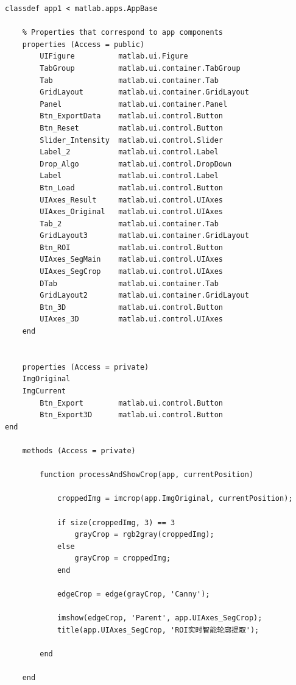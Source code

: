 \documentclass[UTF8, a4paper, 11pt]{ctexart}
\begin{document}
\newpage
\newpage
\begin{lstlisting}
classdef app1 < matlab.apps.AppBase

    % Properties that correspond to app components
    properties (Access = public)
        UIFigure          matlab.ui.Figure
        TabGroup          matlab.ui.container.TabGroup
        Tab               matlab.ui.container.Tab
        GridLayout        matlab.ui.container.GridLayout
        Panel             matlab.ui.container.Panel
        Btn_ExportData    matlab.ui.control.Button
        Btn_Reset         matlab.ui.control.Button
        Slider_Intensity  matlab.ui.control.Slider
        Label_2           matlab.ui.control.Label
        Drop_Algo         matlab.ui.control.DropDown
        Label             matlab.ui.control.Label
        Btn_Load          matlab.ui.control.Button
        UIAxes_Result     matlab.ui.control.UIAxes
        UIAxes_Original   matlab.ui.control.UIAxes
        Tab_2             matlab.ui.container.Tab
        GridLayout3       matlab.ui.container.GridLayout
        Btn_ROI           matlab.ui.control.Button
        UIAxes_SegMain    matlab.ui.control.UIAxes
        UIAxes_SegCrop    matlab.ui.control.UIAxes
        DTab              matlab.ui.container.Tab
        GridLayout2       matlab.ui.container.GridLayout
        Btn_3D            matlab.ui.control.Button
        UIAxes_3D         matlab.ui.control.UIAxes
    end

    
    properties (Access = private)
    ImgOriginal 
    ImgCurrent  
        Btn_Export        matlab.ui.control.Button
        Btn_Export3D      matlab.ui.control.Button
end

    methods (Access = private)
        
        function processAndShowCrop(app, currentPosition)
            
            croppedImg = imcrop(app.ImgOriginal, currentPosition);
            
            if size(croppedImg, 3) == 3
                grayCrop = rgb2gray(croppedImg);
            else
                grayCrop = croppedImg;
            end
            
            edgeCrop = edge(grayCrop, 'Canny');
            
            imshow(edgeCrop, 'Parent', app.UIAxes_SegCrop);
            title(app.UIAxes_SegCrop, 'ROI实时智能轮廓提取');
            
        end
        
    end


\end{lstlisting}
\end{document}
